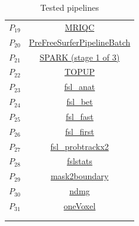 \documentclass[conference]{IEEEtran}
\begin{document}
\begin{table}
\begin{tabular}{cc}
        $P_{19}$ & \href{https://doi.org/10.5281/zenodo.3242714}{MRIQC}	\\
        $P_{20}$ & \href{https://doi.org/10.5281/zenodo.1450995}{PreFreeSurferPipelineBatch}	\\
        $P_{21}$ & \href{https://doi.org/10.5281/zenodo.4010734}{SPARK (stage 1 of 3)}	\\
        $P_{22}$ & \href{https://doi.org/10.5281/zenodo.2621482}{TOPUP}	\\
        $P_{23}$ & \href{https://doi.org/10.5281/zenodo.3899496}{fsl\_anat}	\\
        $P_{24}$ & \href{https://doi.org/10.5281/zenodo.1482743}{fsl\_bet}	\\
        $P_{25}$ & \href{https://doi.org/10.5281/zenodo.1494308}{fsl\_fast}	\\
        $P_{26}$ & \href{https://doi.org/10.5281/zenodo.1494312}{fsl\_first}	\\
        $P_{27}$ & \href{target: https://doi.org/10.5281/zenodo.1450991}{fsl\_probtrackx2}	\\
        $P_{28}$ & \href{https://doi.org/10.5281/zenodo.4472771}{fslstats}	\\
        $P_{29}$ & \href{https://doi.org/10.5281/zenodo.2566443}{mask2boundary}\\
        $P_{30}$ & \href{https://doi.org/10.5281/zenodo.1450999}{ndmg}	\\
        $P_{31}$ & \href{https://doi.org/10.5281/zenodo.3308620}{oneVoxel}\\
        \hline\\
        &
    \end{tabular}
    \caption{Tested pipelines}
    \label{tab:pipeline_names}
\end{table}


\end{document}

